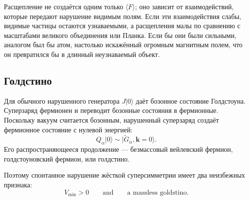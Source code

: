 \begin{classroomqa}
\end{classroomqa}

Расщепление не создаётся одним только \(\langle F\rangle\); оно зависит от взаимодействий, которые передают нарушение видимым полям. Если эти взаимодействия слабы, видимые частицы остаются узнаваемыми, а расщепления малы по сравнению с масштабами великого объединения или Планка. Если бы они были сильными, аналогом был бы атом, настолько искажённый огромным магнитным полем, что он превратился бы в длинный неузнаваемый объект.

\subsection{Голдстино}

Для обычного нарушенного генератора \(J|0\rangle\) даёт бозонное состояние Голдстоуна. Суперзаряд фермионен и переводит бозонные состояния в фермионные. Поскольку вакуум считается бозонным, нарушенный суперзаряд создаёт фермионное состояние с нулевой энергией:
\begin{equation}
Q_\alpha|0\rangle
\sim
|\widetilde G_\alpha,\mathbf k=0\rangle.
\label{eq:l9-goldstino}
\end{equation}
Его распространяющееся продолжение — безмассовый вейлевский фермион, голдстоуновский фермион, или голдстино.

\begin{classroomqa}
\end{classroomqa}

Поэтому спонтанное нарушение жёсткой суперсимметрии имеет два неизбежных признака:
\begin{equation}
\boxed{
V_{\min}>0
\qquad\text{and}\qquad
\text{a massless goldstino}.
}
\label{eq:l9-rigid-breaking-signatures}
\end{equation}

